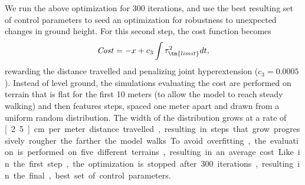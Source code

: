 We run the above optimization for 300 iterations, and use the best resulting set
of control parameters to seed an optimization for robustness to unexpected
changes in ground height. For this second step, the cost function becomes
\begin{align}
    \mathit{Cost} = -x + c_3 \int \tau_\tn{limit}^2 dt,
\end{align}
rewarding the distance travelled and penalizing joint hyperextension ($c_3 =
0.0005$). Instead of level ground, the simulations evaluating the cost are
performed on terrain that is flat for the first 10 meters (to allow the model to
reach steady walking) and then features steps, spaced one meter apart and drawn
from a uniform random distribution. The width of the distribution grows at a
rate of \unit[2.5]{cm} per meter distance travelled, resulting in steps that
grow progressively rougher the farther the model walks. To avoid overfitting,
the evaluation is performed on five different terrains, resulting in an average
cost. Like in the first step, the optimization is stopped after 300 iterations,
resulting in the final, best set of control parameters.

